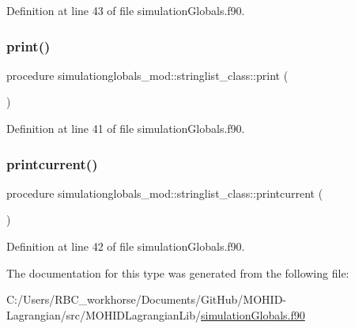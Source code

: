 Definition at line 43 of file simulation\+Globals.\+f90.

\mbox{\label{structsimulationglobals__mod_1_1stringlist__class_a8d55a96a0efd13171bf28964643f4a1f}} 
\subsubsection{\texorpdfstring{print()}{print()}}
{\footnotesize\ttfamily procedure simulationglobals\+\_\+mod\+::stringlist\+\_\+class\+::print (\begin{DoxyParamCaption}{ }\end{DoxyParamCaption})\hspace{0.3cm}{\ttfamily [private]}}



Definition at line 41 of file simulation\+Globals.\+f90.

\mbox{\label{structsimulationglobals__mod_1_1stringlist__class_ab5ad464b1447099e5b68f90ad0de14bc}} 
\subsubsection{\texorpdfstring{printcurrent()}{printcurrent()}}
{\footnotesize\ttfamily procedure simulationglobals\+\_\+mod\+::stringlist\+\_\+class\+::printcurrent (\begin{DoxyParamCaption}{ }\end{DoxyParamCaption})\hspace{0.3cm}{\ttfamily [private]}}



Definition at line 42 of file simulation\+Globals.\+f90.



The documentation for this type was generated from the following file\+:\begin{DoxyCompactItemize}
\item 
C\+:/\+Users/\+R\+B\+C\+\_\+workhorse/\+Documents/\+Git\+Hub/\+M\+O\+H\+I\+D-\/\+Lagrangian/src/\+M\+O\+H\+I\+D\+Lagrangian\+Lib/\mbox{\hyperlink{simulation_globals_8f90}{simulation\+Globals.\+f90}}\end{DoxyCompactItemize}
